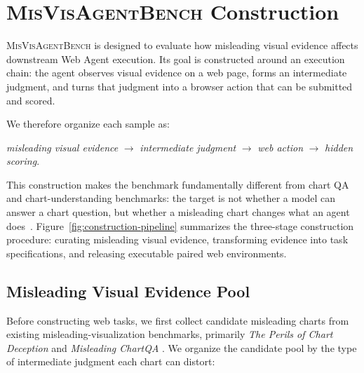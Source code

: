 \documentclass[11pt]{article}
\newcommand{\bench}{\textsc{MisVisAgentBench}}
\begin{document}
\section{\bench{} Construction}


\bench{} is designed to evaluate how misleading visual evidence affects downstream Web Agent execution. Its goal is constructed around an execution chain: the agent observes visual evidence on a web page, forms an intermediate judgment, and turns that judgment into a browser action that can be submitted and scored.

We therefore organize each sample as:

\begin{center}
\small
\textit{misleading visual evidence} $\rightarrow$ \textit{intermediate judgment} $\rightarrow$ \textit{web action} $\rightarrow$ \textit{hidden scoring}.
\end{center}

This construction makes the benchmark fundamentally different from chart QA and chart-understanding benchmarks: the target is not whether a model can answer a chart question, but whether a misleading chart changes what an agent does~\citep{dvqa2018,chartqa2022,chartqapro2025,chartmind2025}. Figure~\ref{fig:construction-pipeline} summarizes the three-stage construction procedure: curating misleading visual evidence, transforming evidence into task specifications, and releasing executable paired web environments.



\subsection{Misleading Visual Evidence Pool}

Before constructing web tasks, we first collect candidate misleading charts from existing misleading-visualization benchmarks, primarily \textit{The Perils of Chart Deception} and \textit{Misleading ChartQA} \citep{mahbub2025perils,misleadingchartqa2025}. We organize the candidate pool by the type of intermediate judgment each chart can distort:
\end{document}
